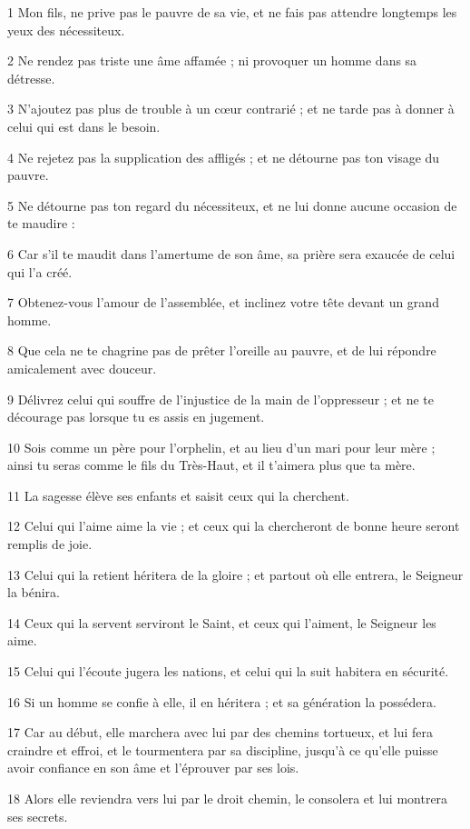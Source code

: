 \par 1 Mon fils, ne prive pas le pauvre de sa vie, et ne fais pas attendre longtemps les yeux des nécessiteux.
\par 2 Ne rendez pas triste une âme affamée ; ni provoquer un homme dans sa détresse.
\par 3 N'ajoutez pas plus de trouble à un cœur contrarié ; et ne tarde pas à donner à celui qui est dans le besoin.
\par 4 Ne rejetez pas la supplication des affligés ; et ne détourne pas ton visage du pauvre.
\par 5 Ne détourne pas ton regard du nécessiteux, et ne lui donne aucune occasion de te maudire :
\par 6 Car s'il te maudit dans l'amertume de son âme, sa prière sera exaucée de celui qui l'a créé.
\par 7 Obtenez-vous l'amour de l'assemblée, et inclinez votre tête devant un grand homme.
\par 8 Que cela ne te chagrine pas de prêter l'oreille au pauvre, et de lui répondre amicalement avec douceur.
\par 9 Délivrez celui qui souffre de l'injustice de la main de l'oppresseur ; et ne te décourage pas lorsque tu es assis en jugement.
\par 10 Sois comme un père pour l'orphelin, et au lieu d'un mari pour leur mère ; ainsi tu seras comme le fils du Très-Haut, et il t'aimera plus que ta mère.
\par 11 La sagesse élève ses enfants et saisit ceux qui la cherchent.
\par 12 Celui qui l'aime aime la vie ; et ceux qui la chercheront de bonne heure seront remplis de joie.
\par 13 Celui qui la retient héritera de la gloire ; et partout où elle entrera, le Seigneur la bénira.
\par 14 Ceux qui la servent serviront le Saint, et ceux qui l'aiment, le Seigneur les aime.
\par 15 Celui qui l'écoute jugera les nations, et celui qui la suit habitera en sécurité.
\par 16 Si un homme se confie à elle, il en héritera ; et sa génération la possédera.
\par 17 Car au début, elle marchera avec lui par des chemins tortueux, et lui fera craindre et effroi, et le tourmentera par sa discipline, jusqu'à ce qu'elle puisse avoir confiance en son âme et l'éprouver par ses lois.
\par 18 Alors elle reviendra vers lui par le droit chemin, le consolera et lui montrera ses secrets.
